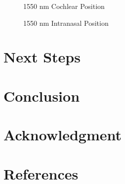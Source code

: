 \documentclass[journal,twoside,web]{ieeecolor}
\begin{document}
\begin{figure}[!htb]
    \caption{\label{fig:1550-Cochlear} 1550 nm Cochlear Position}
\end{figure}

\begin{figure}[!htb]
    \caption{\label{fig:1550-Intra} 1550 nm Intranasal Position}
\end{figure}

\section{Next Steps}
\label{sec:next steps}

\section{Conclusion}
\label{sec:conclusion}

\section*{Acknowledgment}

\section*{References}
\end{document}
